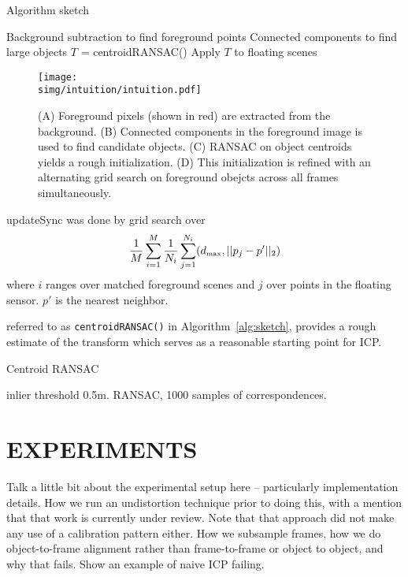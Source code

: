 \documentclass[letterpaper, 10 pt, conference]{ieeeconf}  %
\newcommand{\simg}{static_img}
\begin{document}
\begin{algorithm}
  \caption{Algorithm sketch}
  \label{alg:sketch}
  \SetLine
  \phantom{\;}
  Background subtraction to find foreground points\;
  Connected components to find large objects\;
  $T$ = centroidRANSAC()\;
  Apply $T$ to floating scenes\;
\end{algorithm}

\begin{figure*}
  \centering
  \texttt{[image: \\simg/intuition/intuition.pdf]}
  \caption{(A) Foreground pixels (shown in red) are extracted from the background. (B) Connected components in the foreground image is used to find candidate objects. (C) RANSAC on object centroids yields a rough initialization. (D) This initialization is refined with an alternating grid search on foreground obejcts across all frames simultaneously. }
  \label{fig:}
\end{figure*}


updateSync was done by grid search over
\newcommand{\dmax}{d_{\mbox{\tiny{max}}}}
\begin{align*}
  \frac{1}{M} \sum_{i=1}^M \frac{1}{N_i} \sum_{j=1}^{N_i}    (\dmax, ||p_j - p'||_2)
\end{align*}
where $i$ ranges over matched foreground scenes and $j$ over points in the floating sensor.  $p'$ is the nearest neighbor.


referred to as \texttt{centroidRANSAC()} in Algorithm~\ref{alg:sketch}, provides a rough estimate of the transform which serves as a reasonable starting point for ICP.


\begin{algorithm}
  \caption{Centroid RANSAC}
  \label{alg:cal}
  \SetLine
  \phantom{\;}
  inlier threshold 0.5m.  RANSAC, 1000 samples of correspondences.
\end{algorithm}



\section{EXPERIMENTS}

Talk a little bit about the experimental setup here -- particularly implementation details. How we run an undistortion technique 
prior to doing this, with a mention that that work is currently under review. Note that that approach did not make any use of a 
calibration pattern either. How we subsample frames, 
how we do object-to-frame alignment rather than frame-to-frame or object to object, and why that fails. Show an example of naive ICP failing.
\end{document}
